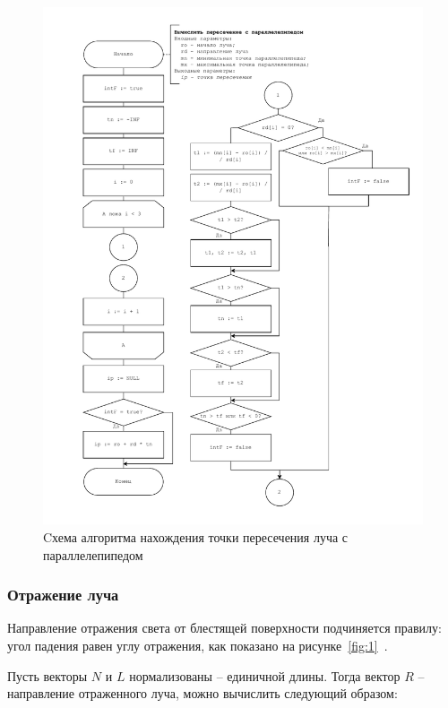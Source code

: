 \begin{figure}[ht!]
	\begin{center}
		\includegraphics[scale=0.78]{diag/main-raycast-parallel.pdf}
	\end{center}
	\caption{Cхема алгоритма нахождения точки пересечения луча с параллелепипедом}
	\label{fig:intb}
\end{figure}

\subsubsection*{Отражение луча}

Направление отражения света от блестящей поверхности подчиняется правилу: угол падения равен углу отражения, как показано на рисунке~\ref{fig:1}~\cite[c.~150]{lengyel2011mathematics}.

Пусть векторы $N$ и $L$ нормализованы -- единичной длины. Тогда вектор $R$ -- направление отраженного луча, можно вычислить следующий образом:

